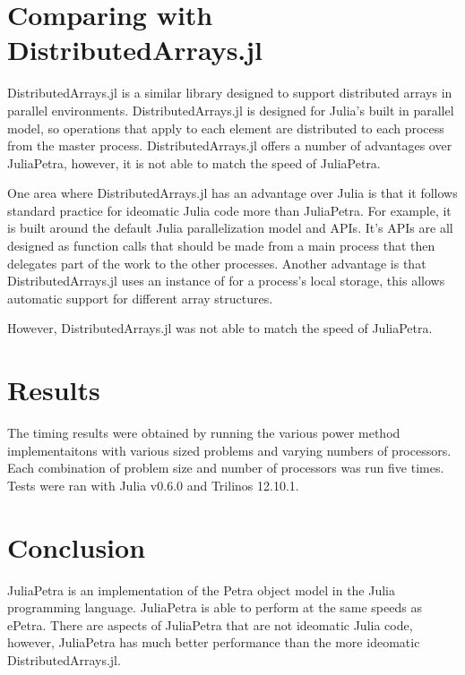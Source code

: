 \documentclass[acmsmall]{acmart}
\newcommand{\juliaSnippet}[1]{\texttt{\detokenize{#1}}}
\begin{document}
\section{Comparing with DistributedArrays.jl}

DistributedArrays.jl is a similar library designed to support distributed arrays in parallel environments.
\cite{DAGithub}
DistributedArrays.jl is designed for Julia's built in parallel model, so operations that apply to
each element are distributed to each process from the master process.  DistributedArrays.jl offers a number of advantages over JuliaPetra, however, it is not able to
match the speed of JuliaPetra.

One area where DistributedArrays.jl has an advantage over Julia is that it follows standard
practice for ideomatic Julia code more than JuliaPetra.
For example, it is built around the default Julia parallelization model and APIs.
It's APIs are all designed as function calls that should be made from a main process that
then delegates part of the work to the other processes. %
Another advantage is that DistributedArrays.jl uses an instance of \juliaSnippet{AbstractArray}
for a process's local storage, this allows automatic support for different array structures.

However, DistributedArrays.jl was not able to match the speed of JuliaPetra.

\section{Results}


The timing results were obtained by running the various power method implementaitons
with various sized problems and varying numbers of processors.
Each combination of problem size and number of processors was run five times.
Tests were ran with Julia v0.6.0 and Trilinos 12.10.1.


\section{Conclusion}

JuliaPetra is an implementation of the Petra object model in the Julia programming language.
JuliaPetra is able to perform at the same speeds as ePetra.
There are aspects of JuliaPetra that are not ideomatic Julia code, however, JuliaPetra has much
better performance than the more ideomatic DistributedArrays.jl.



\end{document}
